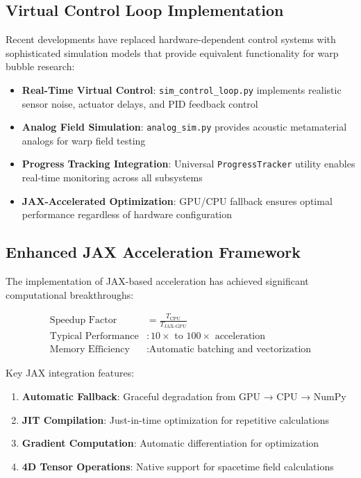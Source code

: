 \documentclass[11pt]{article}
\begin{document}
\subsection{Virtual Control Loop Implementation}

Recent developments have replaced hardware-dependent control systems with sophisticated simulation models that provide equivalent functionality for warp bubble research:

\begin{itemize}
\item \textbf{Real-Time Virtual Control}: \texttt{sim\_control\_loop.py} implements realistic sensor noise, actuator delays, and PID feedback control
\item \textbf{Analog Field Simulation}: \texttt{analog\_sim.py} provides acoustic metamaterial analogs for warp field testing
\item \textbf{Progress Tracking Integration}: Universal \texttt{ProgressTracker} utility enables real-time monitoring across all subsystems
\item \textbf{JAX-Accelerated Optimization}: GPU/CPU fallback ensures optimal performance regardless of hardware configuration
\end{itemize}

\subsection{Enhanced JAX Acceleration Framework}

The implementation of JAX-based acceleration has achieved significant computational breakthroughs:

\begin{align}
\text{Speedup Factor} &= \frac{T_{\text{CPU}}}{T_{\text{JAX-GPU}}} \\
\text{Typical Performance} &: 10\times \text{ to } 100\times \text{ acceleration} \\
\text{Memory Efficiency} &: \text{Automatic batching and vectorization}
\end{align}

Key JAX integration features:
\begin{enumerate}
\item \textbf{Automatic Fallback}: Graceful degradation from GPU → CPU → NumPy
\item \textbf{JIT Compilation}: Just-in-time optimization for repetitive calculations
\item \textbf{Gradient Computation}: Automatic differentiation for optimization
\item \textbf{4D Tensor Operations}: Native support for spacetime field calculations
\end{enumerate}
\end{document}
